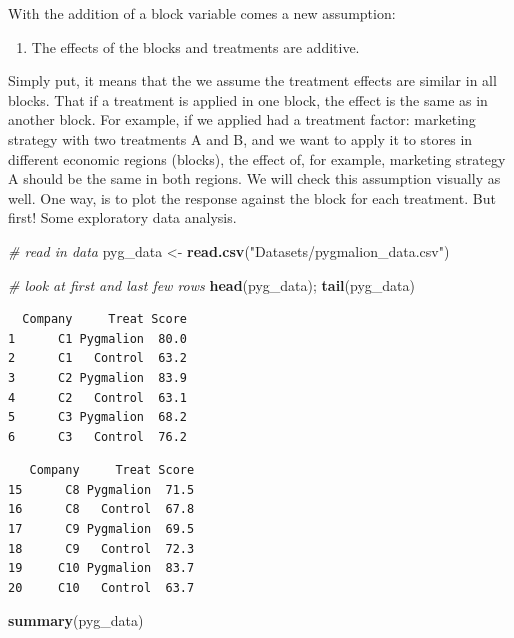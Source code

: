 \documentclass[
  letterpaper,
]{book}
\newenvironment{Shaded}{\begin{snugshade}}{\end{snugshade}}
\newcommand{\CommentTok}[1]{\textcolor[rgb]{0.56,0.35,0.01}{\textit{#1}}}
\newcommand{\FunctionTok}[1]{\textcolor[rgb]{0.13,0.29,0.53}{\textbf{#1}}}
\newcommand{\NormalTok}[1]{#1}
\newcommand{\OtherTok}[1]{\textcolor[rgb]{0.56,0.35,0.01}{#1}}
\newcommand{\StringTok}[1]{\textcolor[rgb]{0.31,0.60,0.02}{#1}}
\providecommand{\tightlist}{%
  \setlength{\itemsep}{0pt}\setlength{\parskip}{0pt}}\usepackage{longtable,booktabs,array}
\begin{document}
With the addition of a block variable comes a new assumption:

\begin{enumerate}
\def\labelenumi{\arabic{enumi}.}
\setcounter{enumi}{4}
\tightlist
\item
  The effects of the blocks and treatments are additive.
\end{enumerate}

Simply put, it means that the we assume the treatment effects are
similar in all blocks. That if a treatment is applied in one block, the
effect is the same as in another block. For example, if we applied had a
treatment factor: marketing strategy with two treatments A and B, and we
want to apply it to stores in different economic regions (blocks), the
effect of, for example, marketing strategy A should be the same in both
regions. We will check this assumption visually as well. One way, is to
plot the response against the block for each treatment. But first! Some
exploratory data analysis.

\begin{Shaded}
\begin{Highlighting}[]
\CommentTok{\# read in data }
\NormalTok{pyg\_data }\OtherTok{\textless{}{-}} \FunctionTok{read.csv}\NormalTok{(}\StringTok{"Datasets/pygmalion\_data.csv"}\NormalTok{)}

\CommentTok{\# look at first and last few rows }
\FunctionTok{head}\NormalTok{(pyg\_data); }\FunctionTok{tail}\NormalTok{(pyg\_data)}
\end{Highlighting}
\end{Shaded}

\begin{verbatim}
  Company     Treat Score
1      C1 Pygmalion  80.0
2      C1   Control  63.2
3      C2 Pygmalion  83.9
4      C2   Control  63.1
5      C3 Pygmalion  68.2
6      C3   Control  76.2
\end{verbatim}

\begin{verbatim}
   Company     Treat Score
15      C8 Pygmalion  71.5
16      C8   Control  67.8
17      C9 Pygmalion  69.5
18      C9   Control  72.3
19     C10 Pygmalion  83.7
20     C10   Control  63.7
\end{verbatim}

\begin{Shaded}
\begin{Highlighting}[]
\FunctionTok{summary}\NormalTok{(pyg\_data)}
\end{Highlighting}
\end{Shaded}
\end{document}
